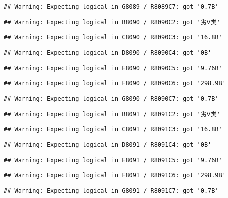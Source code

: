 \documentclass[
]{article}
\begin{document}
\begin{verbatim}
## Warning: Expecting logical in G8089 / R8089C7: got '0.7B'
\end{verbatim}

\begin{verbatim}
## Warning: Expecting logical in B8090 / R8090C2: got '劣Ⅴ类'
\end{verbatim}

\begin{verbatim}
## Warning: Expecting logical in C8090 / R8090C3: got '16.8B'
\end{verbatim}

\begin{verbatim}
## Warning: Expecting logical in D8090 / R8090C4: got '0B'
\end{verbatim}

\begin{verbatim}
## Warning: Expecting logical in E8090 / R8090C5: got '9.76B'
\end{verbatim}

\begin{verbatim}
## Warning: Expecting logical in F8090 / R8090C6: got '298.9B'
\end{verbatim}

\begin{verbatim}
## Warning: Expecting logical in G8090 / R8090C7: got '0.7B'
\end{verbatim}

\begin{verbatim}
## Warning: Expecting logical in B8091 / R8091C2: got '劣Ⅴ类'
\end{verbatim}

\begin{verbatim}
## Warning: Expecting logical in C8091 / R8091C3: got '16.8B'
\end{verbatim}

\begin{verbatim}
## Warning: Expecting logical in D8091 / R8091C4: got '0B'
\end{verbatim}

\begin{verbatim}
## Warning: Expecting logical in E8091 / R8091C5: got '9.76B'
\end{verbatim}

\begin{verbatim}
## Warning: Expecting logical in F8091 / R8091C6: got '298.9B'
\end{verbatim}

\begin{verbatim}
## Warning: Expecting logical in G8091 / R8091C7: got '0.7B'
\end{verbatim}
\end{document}
